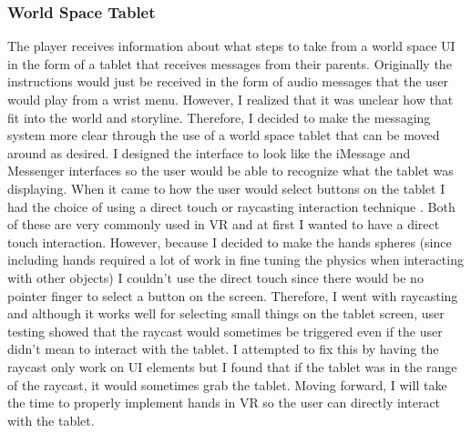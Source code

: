 \documentclass[10pt,twocolumn]{article}
\begin{document}
\subsubsection{World Space Tablet}
The player receives information about what steps to take from a world space UI in the form of a tablet that receives messages from their parents. Originally the instructions would just be received in the form of audio messages that the user would play from a wrist menu. However, I realized that it was unclear how that fit into the world and storyline. Therefore, I decided to make the messaging system more clear through the use of a world space tablet that can be moved around as desired. I designed the interface to look like the iMessage and Messenger interfaces so the user would be able to recognize what the tablet was displaying. When it came to how the user would select buttons on the tablet I had the choice of using a direct touch or raycasting interaction technique \cite{learnXR2020}. Both of these are very commonly used in VR and at first I wanted to have a direct touch interaction. However, because I decided to make the hands spheres (since including hands required a lot of work in fine tuning the physics when interacting with other objects) I couldn’t use the direct touch since there would be no pointer finger to select a button on the screen. Therefore, I went with raycasting and although it works well for selecting small things on the tablet screen, user testing showed that the raycast would sometimes be triggered even if the user didn’t mean to interact with the tablet. I attempted to fix this by having the raycast only work on UI elements but I found that if the tablet was in the range of the raycast, it would sometimes grab the tablet. Moving forward, I will take the time to properly implement hands in VR so the user can directly interact with the tablet.
 
\end{document}
